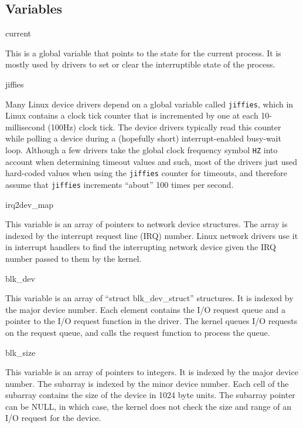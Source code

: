 \subsection{Variables}

\begin{icsymlist}
\item[current]

This is a global variable that points to the state for the current
process.  It is mostly used by drivers to set or clear the
interruptible state of the process.

\item[jiffies]

Many Linux device drivers depend on a global variable called {\tt jiffies},
which in Linux contains a clock tick counter
that is incremented by one at each 10-millisecond (100Hz) clock tick.
The device drivers typically read this counter while polling a device
during a (hopefully short) interrupt-enabled busy-wait loop.
Although a few drivers
take the global clock frequency symbol {\tt HZ} into account
when determining timeout values and such,
most of the drivers just used hard-coded values
when using the {\tt jiffies} counter for timeouts,
and therefore assume that {\tt jiffies} increments
``about'' 100 times per second.

\item[irq2dev_map]

This variable is an array of pointers to network device structures.
The array is indexed by the interrupt request line (IRQ) number.
Linux network drivers use it in interrupt handlers to find the
interrupting network device given the IRQ number passed to them by the
kernel.

\item[blk_dev]

This variable is an array of ``struct blk_dev_struct'' structures.  It
is indexed by the major device number.  Each element contains the I/O
request queue and a pointer to the I/O request function in the
driver.  The kernel queues I/O requests on the request queue, and calls
the request function to process the queue.

\item[blk_size]

This variable is an array of pointers to integers.  It is indexed by
the major device number.  The subarray is indexed by the minor device
number.  Each cell of the subarray contains the size of the device in
1024 byte units.  The subarray pointer can be NULL, in which case, the
kernel does not check the size and range of an I/O request for the device.


\end{icsymlist}
